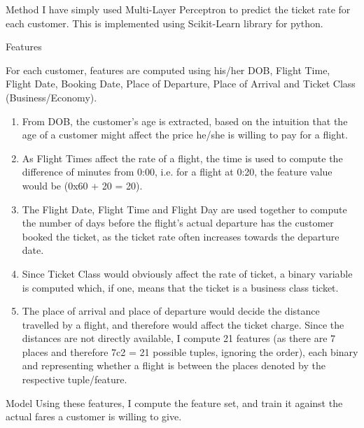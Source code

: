 \documentclass{article}
\begin{document}
\begin{question}

	\begin{qsection}{Method}
		I have simply used Multi-Layer Perceptron to predict the ticket rate for each customer. This is implemented using Scikit-Learn library for python.
	\end{qsection}

	\begin{qsection}{Features}

		For each customer, features are computed using his/her DOB, Flight Time, Flight Date, Booking Date, Place of Departure, Place of Arrival and Ticket Class (Business/Economy).

		\begin{enumerate}[label=\textbf{\arabic*.}]
			\item From DOB, the customer's age is extracted, based on the intuition that the age of a customer might affect the price he/she is willing to pay for a flight.

			\item As Flight Times affect the rate of a flight, the time is used to compute the difference of minutes from 0:00, i.e. for a flight at 0:20, the feature value would be (0x60 + 20 = 20).

			\item The Flight Date, Flight Time and Flight Day are used together to compute the number of days before the flight's actual departure has the customer booked the ticket, as the ticket rate often increases towards the departure date.

			\item Since Ticket Class would obviously affect the rate of ticket, a binary variable is computed which, if one, means that the ticket is a business class ticket.

			\item The place of arrival and place of departure would decide the distance travelled by a flight, and therefore would affect the ticket charge. Since the distances are not directly available, I compute 21 features (as there are 7 places and therefore 7c2 = 21 possible tuples, ignoring the order), each binary and representing whether a flight is between the places denoted by the respective tuple/feature.
		\end{enumerate}

	\end{qsection}

	\begin{qsection}{Model}
		Using these features, I compute the feature set, and train it against the actual fares a customer is willing to give.


\end{qsection}
\end{question}
\end{document}
